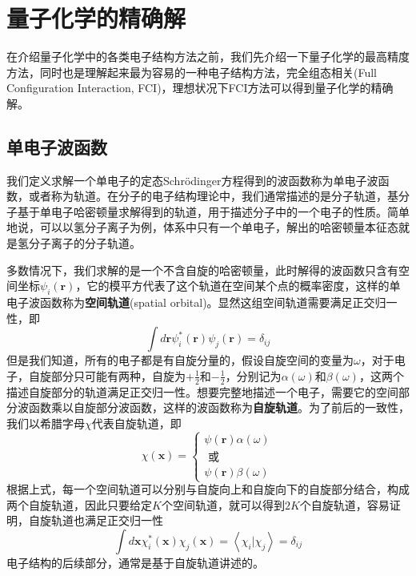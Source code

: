 \documentclass[12pt,a4paper,openany,twoside]{book}
\numberwithin{equation}{section}
\newcommand{\sch}{Schr\"odinger}
\begin{document}
      \section{量子化学的精确解}
        在介绍量子化学中的各类电子结构方法之前，我们先介绍一下量子化学的最高精度方法，同时也是理解起来最为容易的一种电子结构方法，完全组态相关(Full Configuration Interaction, FCI)，理想状况下FCI方法可以得到量子化学的精确解。
        \subsection{单电子波函数}
          我们定义求解一个单电子的定态\sch 方程得到的波函数称为单电子波函数，或者称为轨道。在分子的电子结构理论中，我们通常描述的是分子轨道，基分子基于单电子哈密顿量求解得到的轨道，用于描述分子中的一个电子的性质。简单地说，可以以氢分子离子为例，体系中只有一个单电子，解出的哈密顿量本征态就是氢分子离子的分子轨道。
          
          多数情况下，我们求解的是一个不含自旋的哈密顿量，此时解得的波函数只含有空间坐标$\psi_i(\mathbf{r})$，它的模平方代表了这个轨道在空间某个点的概率密度，这样的单电子波函数称为\textbf{空间轨道}(spatial orbital)。显然这组空间轨道需要满足正交归一性，即
          \begin{equation}
            \int d \mathbf{r} \psi_{i}^{*}(\mathbf{r}) \psi_{j}(\mathbf{r})=\delta_{i j}
          \end{equation}
          但是我们知道，所有的电子都是有自旋分量的，假设自旋空间的变量为$\omega$，对于电子，自旋部分只可能有两种，自旋为$+\frac{1}{2}$和$-\frac{1}{2}$，分别记为$\alpha(\omega)$和$\beta (\omega)$，这两个描述自旋部分的轨道满足正交归一性。想要完整地描述一个电子，需要它的空间部分波函数乘以自旋部分波函数，这样的波函数称为\textbf{自旋轨道}。为了前后的一致性，我们以希腊字母$\chi$代表自旋轨道，即
          \begin{equation}
            \chi(\mathbf{x})=\left\{\begin{array}{c}{\psi(\mathbf{r}) \alpha(\omega)} \\ {\text { 或 }} \\ {\psi(\mathbf{r}) \beta(\omega)}\end{array}\right.
          \end{equation}
          根据上式，每一个空间轨道可以分别与自旋向上和自旋向下的自旋部分结合，构成两个自旋轨道，因此只要给定$K$个空间轨道，就可以得到$2K$个自旋轨道，容易证明，自旋轨道也满足正交归一性
          \begin{equation}
            \int d \mathbf{x} \chi_{i}^{*}(\mathbf{x}) \chi_{j}(\mathbf{x})=\left\langle\chi_{i} | \chi_{j}\right\rangle=\delta_{i j}
          \end{equation}
          电子结构的后续部分，通常是基于自旋轨道讲述的。
\end{document}
